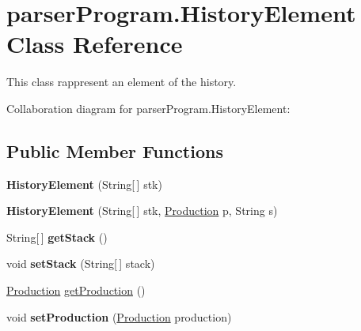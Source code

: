 \hypertarget{classparser_program_1_1_history_element}{\section{parser\-Program.\-History\-Element Class Reference}
\label{classparser_program_1_1_history_element}
}


This class rappresent an element of the history.  




Collaboration diagram for parser\-Program.\-History\-Element\-:
\subsection*{Public Member Functions}
\begin{DoxyCompactItemize}
\item 
\hypertarget{classparser_program_1_1_history_element_ae6d3bdd3606301f0b08d4e9258b5c5cf}{{\bfseries History\-Element} (String\mbox{[}$\,$\mbox{]} stk)}\label{classparser_program_1_1_history_element_ae6d3bdd3606301f0b08d4e9258b5c5cf}

\item 
\hypertarget{classparser_program_1_1_history_element_a0cd8852d35a48856c6e893ae33cbde30}{{\bfseries History\-Element} (String\mbox{[}$\,$\mbox{]} stk, \hyperlink{classcontext_free_1_1grammar_1_1_production}{Production} p, String s)}\label{classparser_program_1_1_history_element_a0cd8852d35a48856c6e893ae33cbde30}

\item 
\hypertarget{classparser_program_1_1_history_element_a8f20a699af1fa68f114acef0f72117b5}{String\mbox{[}$\,$\mbox{]} {\bfseries get\-Stack} ()}\label{classparser_program_1_1_history_element_a8f20a699af1fa68f114acef0f72117b5}

\item 
\hypertarget{classparser_program_1_1_history_element_a640ecb265a57f1b084fe99cf2a2a9a35}{void {\bfseries set\-Stack} (String\mbox{[}$\,$\mbox{]} stack)}\label{classparser_program_1_1_history_element_a640ecb265a57f1b084fe99cf2a2a9a35}

\item 
\hyperlink{classcontext_free_1_1grammar_1_1_production}{Production} \hyperlink{classparser_program_1_1_history_element_a1e3354d1bc805c952c4ed9a35ddac0dd}{get\-Production} ()
\item 
\hypertarget{classparser_program_1_1_history_element_a2311f48be369f4d0e6be47c2a7ac7546}{void {\bfseries set\-Production} (\hyperlink{classcontext_free_1_1grammar_1_1_production}{Production} production)}\label{classparser_program_1_1_history_element_a2311f48be369f4d0e6be47c2a7ac7546}


\end{DoxyCompactItemize}

